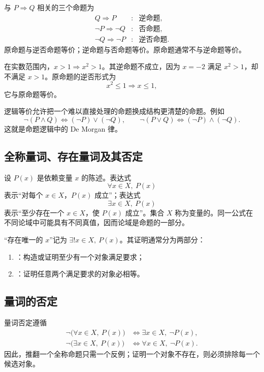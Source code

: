 与 \(P\Rightarrow Q\) 相关的三个命题为
\[
\begin{array}{ccl}
  Q\Rightarrow P &:& \text{逆命题},\\
  \neg P\Rightarrow\neg Q &:& \text{否命题},\\
  \neg Q\Rightarrow\neg P &:& \text{逆否命题}.
\end{array}
\]
原命题与逆否命题等价；逆命题与否命题等价。原命题通常不与逆命题等价。

\begin{example}
在实数范围内，\(x>1\Rightarrow x^2>1\)。其逆命题不成立，因为 \(x=-2\) 满足 \(x^2>1\)，却不满足 \(x>1\)。原命题的逆否形式为
\[
  x^2\le 1\Rightarrow x\le 1,
\]
它与原命题等价。
\end{example}

逻辑等价允许把一个难以直接处理的命题换成结构更清楚的命题。例如
\[
  \neg(P\land Q)\Leftrightarrow(\neg P)\lor(\neg Q),\qquad
  \neg(P\lor Q)\Leftrightarrow(\neg P)\land(\neg Q).
\]
这就是命题逻辑中的 De Morgan 律。

\subsection{全称量词、存在量词及其否定}

设 \(P(x)\) 是依赖变量 \(x\) 的陈述。表达式
\[
  \forall x\in X,\ P(x)
\]
表示“对每个 \(x\in X\)，\(P(x)\) 成立”；表达式
\[
  \exists x\in X,\ P(x)
\]
表示“至少存在一个 \(x\in X\)，使 \(P(x)\) 成立”。集合 \(X\) 称为变量的。同一公式在不同论域中可能具有不同真值，因而论域是命题的一部分。

“存在唯一的 \(x\)”记为 \(\exists!x\in X,\ P(x)\)。其证明通常分为两部分：
\begin{enumerate}
  \item {}：构造或证明至少有一个对象满足要求；
  \item {}：证明任意两个满足要求的对象必相等。
\end{enumerate}

\subsection{量词的否定}

量词否定遵循
\[
\begin{aligned}
  \neg\bigl(\forall x\in X,\ P(x)\bigr)
    &\Leftrightarrow \exists x\in X,\ \neg P(x),\\
  \neg\bigl(\exists x\in X,\ P(x)\bigr)
    &\Leftrightarrow \forall x\in X,\ \neg P(x).
\end{aligned}
\]
因此，推翻一个全称命题只需一个反例；证明一个对象不存在，则必须排除每一个候选对象。

